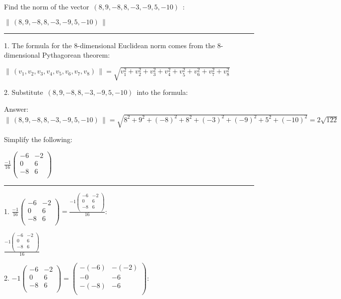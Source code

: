 \documentclass{article}
\begin{document}
\pagebreak

Find the norm of the vector $\, (8,9,-8,8,-3,-9,5,-10)\,$ :

$\| \, (8,9,-8,8,-3,-9,5,-10)\, \|$

\hrule

1. The formula for the 8-dimensional Euclidean norm comes from the 8-dimensional Pythagorean theorem:

$\left\| \, \left(v_1,v_2,v_3,v_4,v_5,v_6,v_7,v_8\right)\, \right\| =\sqrt{v_1^2+v_2^2+v_3^2+v_4^2+v_5^2+v_6^2+v_7^2+v_8^2}$

2. Substitute $\, (8,9,-8,8,-3,-9,5,-10)\,$ into the formula:

Answer: $\| \, (8,9,-8,8,-3,-9,5,-10)\, \| =\sqrt{8^2+9^2+(-8)^2+8^2+(-3)^2+(-9)^2+5^2+(-10)^2}=2 \sqrt{122}$

\pagebreak

Simplify the following:

$\frac{-1}{16}\left(
\begin{array}{cc}
-6 & -2 \\
 0 & 6 \\
 -8 & 6 \\
\end{array}
\right)$

\hrule

1. $\frac{-1}{16}\left(
\begin{array}{cc}
-6 & -2 \\
 0 & 6 \\
 -8 & 6 \\
\end{array}
\right)=\frac{-1\left(
\begin{array}{cc}
-6 & -2 \\
 0 & 6 \\
 -8 & 6 \\
\end{array}
\right)}{16}$:

$\frac{-1\left(
\begin{array}{cc}
-6 & -2 \\
 0 & 6 \\
 -8 & 6 \\
\end{array}
\right)}{16}$

2. $-1\left(
\begin{array}{cc}
-6 & -2 \\
 0 & 6 \\
 -8 & 6 \\
\end{array}
\right)=\left(
\begin{array}{cc}
-(-6) & -(-2) \\
 -0 & -6 \\
 -(-8) & -6 \\
\end{array}
\right):$
\end{document}
